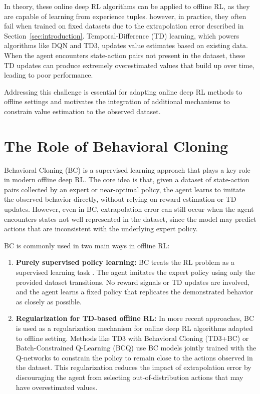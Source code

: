 In theory, these online deep RL algorithms can be applied to offline RL, as they are capable of learning from experience tuples. however, in practice, they often fail when trained on fixed datasets due to the extrapolation error described in Section~\ref{sec:introduction}. Temporal-Difference (TD) learning, which powers algorithms like DQN and TD3, updates value estimates based on existing data. When the agent encounters state-action pairs not present in the dataset, these TD updates can produce extremely overestimated values that build up over time, leading to poor performance.

Addressing this challenge is essential for adapting online deep RL methods to offline settings and motivates the integration of additional mechanisms to constrain value estimation to the observed dataset.





\section{The Role of Behavioral Cloning}

Behavioral Cloning (BC) is a supervised learning approach that plays a key role in modern offline deep RL. The core idea is that, given a dataset of state-action pairs collected by an expert or near-optimal policy, the agent learns to imitate the observed behavior directly, without relying on reward estimation or TD updates. However, even in BC, extrapolation error can still occur when the agent encounters states not well represented in the dataset, since the model may predict actions that are inconsistent with the underlying expert policy.

BC is commonly used in two main ways in offline RL:
\begin{enumerate}
    \item \textbf{Purely supervised policy learning:} BC treats the RL problem as a supervised learning task \cite{BC_ORL_only}. The agent imitates the expert policy using only the provided dataset transitions. No reward signals or TD updates are involved, and the agent learns a fixed policy that replicates the demonstrated behavior as closely as possible.
    
    \item \textbf{Regularization for TD-based offline RL:} In more recent approaches, BC is used as a regularization mechanism for online deep RL algorithms adapted to offline setting. Methods like TD3 with Behavioral Cloning (TD3+BC) \cite{fujimoto2021minimalist} or Batch-Constrained Q-Learning (BCQ) \cite{BCQ_benchmarking} use BC models jointly trained with the Q-networks to constrain the policy to remain close to the actions observed in the dataset. This regularization reduces the impact of extrapolation error by discouraging the agent from selecting out-of-distribution actions that may have overestimated values.
\end{enumerate}

